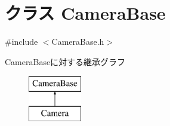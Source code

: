 \hypertarget{class_camera_base}{\section{クラス Camera\-Base}
\label{class_camera_base}
}


{\ttfamily \#include $<$Camera\-Base.\-h$>$}

Camera\-Baseに対する継承グラフ\begin{figure}[H]
\begin{center}
\leavevmode
\includegraphics[height=2.000000cm]{dd/d75/class_camera_base}
\end{center}
\end{figure}
